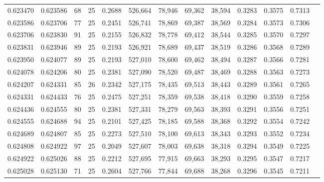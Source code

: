 \begin{tabular}{rrrrrrrrrrrrr}
0.623470 & 0.623586 &    68 &  25 &                                     0.2688 & 526,664 &  78,946 &  69,362 &  38,594 & 0.3283 & 0.3575 & 0.7313 \\
0.623586 & 0.623706 &    77 &  25 &                                     0.2451 & 526,741 &  78,869 &  69,387 &  38,569 & 0.3284 & 0.3573 & 0.7306 \\
0.623706 & 0.623830 &    91 &  25 &                                     0.2155 & 526,832 &  78,778 &  69,412 &  38,544 & 0.3285 & 0.3570 & 0.7297 \\
0.623831 & 0.623946 &    89 &  25 &                                     0.2193 & 526,921 &  78,689 &  69,437 &  38,519 & 0.3286 & 0.3568 & 0.7289 \\
0.623950 & 0.624077 &    89 &  25 &                                     0.2193 & 527,010 &  78,600 &  69,462 &  38,494 & 0.3287 & 0.3566 & 0.7281 \\
0.624078 & 0.624206 &    80 &  25 &                                     0.2381 & 527,090 &  78,520 &  69,487 &  38,469 & 0.3288 & 0.3563 & 0.7273 \\
0.624207 & 0.624331 &    85 &  26 &                                     0.2342 & 527,175 &  78,435 &  69,513 &  38,443 & 0.3289 & 0.3561 & 0.7265 \\
0.624331 & 0.624433 &    76 &  25 &                                     0.2475 & 527,251 &  78,359 &  69,538 &  38,418 & 0.3290 & 0.3559 & 0.7258 \\
0.624436 & 0.624555 &    80 &  25 &                                     0.2381 & 527,331 &  78,279 &  69,563 &  38,393 & 0.3291 & 0.3556 & 0.7251 \\
0.624555 & 0.624688 &    94 &  25 &                                     0.2101 & 527,425 &  78,185 &  69,588 &  38,368 & 0.3292 & 0.3554 & 0.7242 \\
0.624689 & 0.624807 &    85 &  25 &                                     0.2273 & 527,510 &  78,100 &  69,613 &  38,343 & 0.3293 & 0.3552 & 0.7234 \\
0.624808 & 0.624922 &    97 &  25 &                                     0.2049 & 527,607 &  78,003 &  69,638 &  38,318 & 0.3294 & 0.3549 & 0.7225 \\
0.624922 & 0.625026 &    88 &  25 &                                     0.2212 & 527,695 &  77,915 &  69,663 &  38,293 & 0.3295 & 0.3547 & 0.7217 \\
0.625028 & 0.625130 &    71 &  25 &                                     0.2604 & 527,766 &  77,844 &  69,688 &  38,268 & 0.3296 & 0.3545 & 0.7211 \\

\end{tabular}
